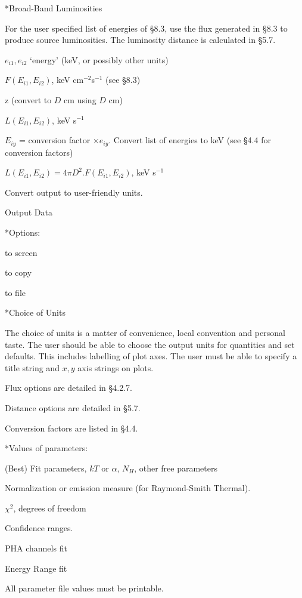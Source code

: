 \**Broad-Band Luminosities
 
{\list


For the user specified list of energies of \S8.3, use the flux generated in
\S8.3 to produce source luminosities.  The luminosity distance is
calculated in \S5.7.

 
$e_{i1}, e_{i2}$ `energy' (keV, or possibly other units)
 
$F(E_{i1},E_{i2})$, keV cm$^{-2}$s$^{-1}$ (see \S 8.3)

z (convert to $D$ cm using %
$D$ cm)

 
$L(E_{i1},E_{i2})$,  keV s$^{-1}$
 
 
$E_{iy}$ = conversion factor $\times e_{iy}$. Convert list of energies to keV
(see \S4.4 for conversion factors)

$L(E_{i1},E_{i2}) = 4\pi D^{2}.F(E_{i1},E_{i2})$, keV s$^{-1}$

Convert output to user-friendly units.

}
 
\@{Output Data}
 
\**Options:

{\list

to screen

to copy

to file
 
}
 
\**Choice of Units

{\list

The choice of units is a matter of convenience, local convention and
personal taste.  The user should be able to choose the output units for
quantities and set defaults.  This includes labelling of plot axes.
The user must be able to specify a title string and $x,y$ axis strings on
plots.

Flux options are detailed in \S4.2.7.

Distance options are detailed in \S5.7.

Conversion factors are listed in \S4.4.

}
 
\**Values of parameters:

{\list

(Best) Fit parameters, $kT$ or $\alpha$, $N_H$, other free parameters

Normalization or emission measure (for Raymond-Smith Thermal).

$\chi^{2}$, degrees of freedom

Confidence ranges.

PHA channels fit

Energy Range fit

All parameter file values must be printable.

}
 

